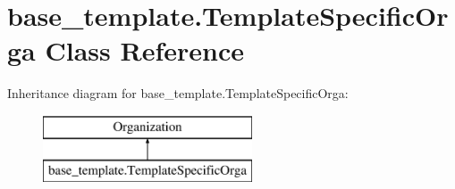 \hypertarget{classbase__template_1_1_template_specific_orga}{}\section{base\+\_\+template.\+Template\+Specific\+Orga Class Reference}
\label{classbase__template_1_1_template_specific_orga}
Inheritance diagram for base\+\_\+template.\+Template\+Specific\+Orga\+:\begin{figure}[H]
\begin{center}
\leavevmode
\includegraphics[height=2.000000cm]{classbase__template_1_1_template_specific_orga}
\end{center}
\end{figure}
